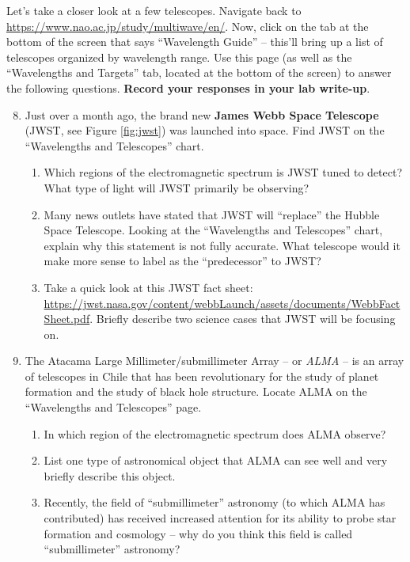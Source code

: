 \documentclass[11pt]{article}
\begin{document}
Let's take a closer look at a few telescopes. Navigate back to \url{https://www.nao.ac.jp/study/multiwave/en/}. Now, click on the tab at the bottom of the screen that says ``Wavelength Guide'' -- this'll bring up a list of telescopes organized by wavelength range. Use this page (as well as the ``Wavelengths and Targets'' tab, located at the bottom of the screen) to answer the following questions. \textbf{Record your responses in your lab write-up}.
\begin{enumerate}
    \setcounter{enumi}{7}
    \item Just over a month ago, the brand new \textbf{James Webb Space Telescope} (JWST, see Figure \ref{fig:jwst}) was launched into space. Find JWST on the ``Wavelengths and Telescopes'' chart. 
    \begin{enumerate}[label=(\alph*)]
        \item Which regions of the electromagnetic spectrum is JWST tuned to detect? What type of light will JWST primarily be observing? 
        
        \item Many news outlets have stated that JWST will ``replace'' the Hubble Space Telescope. Looking at the ``Wavelengths and Telescopes'' chart, explain why this statement is not fully accurate. What telescope would it make more sense to label as the ``predecessor'' to JWST? 
        
        \item Take a quick look at this JWST fact sheet: \url{https://jwst.nasa.gov/content/webbLaunch/assets/documents/WebbFactSheet.pdf}. Briefly describe two science cases that JWST will be focusing on.
    \end{enumerate}
    
    \item The Atacama Large Millimeter/submillimeter Array -- or \emph{ALMA} -- is an array of telescopes in Chile that has been revolutionary for the study of planet formation and the study of black hole structure. Locate ALMA on the ``Wavelengths and Telescopes'' page. 
    \begin{enumerate}[label=(\alph*)]
        \item In which region of the electromagnetic spectrum does ALMA observe? 
        
        \item List one type of astronomical object that ALMA can see well and very briefly describe this object. 
        
        \item Recently, the field of ``submillimeter'' astronomy (to which ALMA has contributed) has received increased attention for its ability to probe star formation and cosmology -- why do you think this field is called ``submillimeter'' astronomy?
    \end{enumerate}
    

\end{enumerate}
\end{document}
